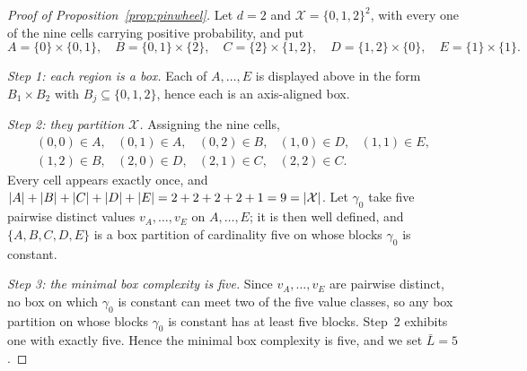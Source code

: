 \documentclass[11pt]{article}
\theoremstyle{plain}
\theoremstyle{definition}
\theoremstyle{remark}
\newcommand{\cX}{\mathcal{X}}
\DeclarePairedDelimiter{\card}{\lvert}{\rvert}
\begin{document}
\begin{proof}[Proof of Proposition~\ref{prop:pinwheel}]
Let $d=2$ and $\cX=\{0,1,2\}^2$, with every one of the nine cells carrying
positive probability, and put
\[
  A=\{0\}\times\{0,1\},\quad
  B=\{0,1\}\times\{2\},\quad
  C=\{2\}\times\{1,2\},\quad
  D=\{1,2\}\times\{0\},\quad
  E=\{1\}\times\{1\} .
\]

\emph{Step 1: each region is a box.} Each of $A,\dots,E$ is displayed above in
the form $B_1\times B_2$ with $B_j\subseteq\{0,1,2\}$, hence each is an
axis-aligned box.

\emph{Step 2: they partition $\cX$.} Assigning the nine cells,
\[
\begin{array}{lllll}
 (0,0)\in A, & (0,1)\in A, & (0,2)\in B, & (1,0)\in D, & (1,1)\in E,\\
 (1,2)\in B, & (2,0)\in D, & (2,1)\in C, & (2,2)\in C. &
\end{array}
\]
Every cell appears exactly once, and
$\card A+\card B+\card C+\card D+\card E=2+2+2+2+1=9=\card{\cX}$. Let $\gamma_0$
take five pairwise distinct values $v_A,\dots,v_E$ on $A,\dots,E$; it is then
well defined, and $\{A,B,C,D,E\}$ is a box partition of cardinality five on whose
blocks $\gamma_0$ is constant.

\emph{Step 3: the minimal box complexity is five.} Since $v_A,\dots,v_E$ are
pairwise distinct, no box on which $\gamma_0$ is constant can meet two of the
five value classes, so any box partition on whose blocks $\gamma_0$ is constant
has at least five blocks. Step~2 exhibits one with exactly five. Hence the
minimal box complexity is five, and we set $\bar L=5$.


\end{proof}
\end{document}
